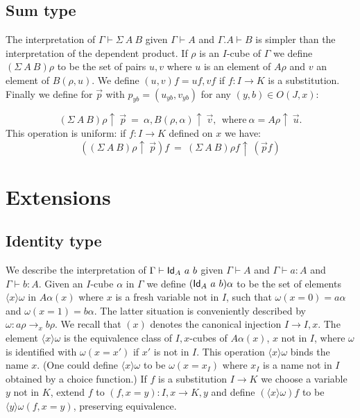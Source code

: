 \documentclass[10pt,a4paper]{article}
\newcommand{\Id}{{\sf Id}}
\newcommand{\rup}[1]{#1{\uparrow}}
\newcommand{\bind}[2]{{\langle}#1{\rangle}#2}
\begin{document}
\subsection{Sum type}

 The interpretation of $\Gamma\vdash\Sigma~A~B$ given $\Gamma\vdash A$ and $\Gamma.A\vdash B$
is simpler than the interpretation of the dependent product. If $\rho$ is an $I$-cube
of $\Gamma$ we define $(\Sigma~A~B)\rho$ to be the set of pairs $u,v$ where $u$ is
an element of $A\rho$ and $v$ an element of $B(\rho,u)$. We define $(u,v)f = uf,vf$
if $f:I\to K$ is a substitution. Finally we define for $\vec p$
with $p_{yb}=(u_{yb},v_{yb})$ for any $(y,b)\in O(J,x)$:

$$(\rup{\Sigma~A~B)\rho}~\vec{p}~=~ \alpha, \rup{B(\rho,\alpha)}~\vec{v},~~
\text{where}~\alpha = \rup{A\rho}~ \vec u.$$
This operation is uniform: if $f:I\to K$ defined on $x$ we have:
$$(\rup{(\Sigma~A~B)\rho}~\vec{p})f~=~\rup{(\Sigma~A~B)\rho f}~(\vec{p}f)$$

\medskip

\section{Extensions}

\subsection{Identity type}

We describe the interpretation of $\Gamma\vdash\Id_A~a~b$ given
$\Gamma\vdash A$ and $\Gamma\vdash a:A$ and $\Gamma\vdash b:A$. Given
an $I$-cube $\alpha$ in $\Gamma$ we define $(\Id_A~a~b)\alpha$ to be
the set of elements $\bind{x}{\omega}$ in $A\alpha(x)$ where $x$ is a
fresh variable not in $I$, such that $\omega(x=0) = a\alpha$ and
$\omega(x=1) = b\alpha$. The latter situation is conveniently
described by $\omega: a\rho\to_x b\rho$.  We recall that $(x)$ denotes
the canonical injection $I \to I,x$. The element $\bind{x}{\omega}$ is
the equivalence class of $I,x$-cubes of $A\alpha(x)$, $x$ not in $I$,
where $\omega$ is identified with $\omega(x=x')$ if $x'$ is not in
$I$. This operation $\bind{x}{\omega}$ binds the name $x$.  (One could
define $\bind{x}{\omega}$ to be $\omega(x = x_I)$ where $x_I$ is a
name not in $I$ obtained by a choice function.) If $f$ is a
substitution $I \to K$ we choose a variable $y$ not in $K$, extend $f$
to $(f,x=y): I,x \to K,y$ and define $(\bind{x}{\omega}) f$ to be
$\bind{y}{\omega (f,x=y)}$, preserving equivalence.
\end{document}
